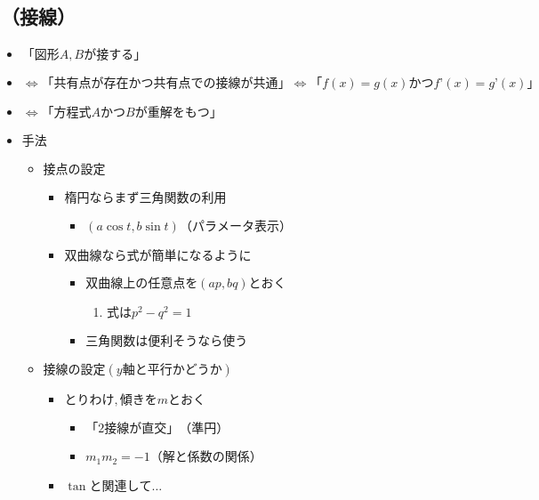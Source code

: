 \documentclass[dvipdfmx,uplatex]{jsarticle}
\begin{document}
\subsection{（接線）}
\begin{itemize}
	\item $ 「図形A,Bが接する」$
	\item $ \Leftrightarrow「共有点が存在かつ共有点での接線が共通」⇔「f(x) = g(x) かつ f’(x) = g’(x)」$
	\item $ \Leftrightarrow「方程式AかつBが重解をもつ」$
	\item $ 手法$
	\begin{itemize}
		\item $ 接点の設定$
		\begin{itemize}
			\item $ 楕円ならまず三角関数の利用$
			\begin{itemize}
				\item $ (a\cos t, b\sin t)（パラメータ表示）$
			\end{itemize}
			\item $ 双曲線なら式が簡単になるように$
			\begin{itemize}
				\item $ 双曲線上の任意点を(ap, bq)とおく$
				\begin{enumerate}
					\item $ 式はp^2 - q^2 = 1$
				\end{enumerate}
				\item $ 三角関数は便利そうなら使う$
			\end{itemize}
		\end{itemize}
		\item $ 接線の設定 (y軸と平行かどうか)$
		\begin{itemize}
			\item $ とりわけ,傾きをmとおく$
			\begin{itemize}
				\item $ 「2接線が直交」（準円）$
				\item $ m_1m_2 = -1（解と係数の関係）$
			\end{itemize}
			\item $ \tan と関連して…$
		\end{itemize}
	\end{itemize}
\end{itemize}
\end{document}
